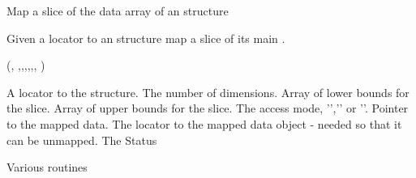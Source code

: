 \begin{manroutinedescription}
     Map a slice of the data array of an {} structure

     Given a locator to an {} structure map a slice of its main {%
}.

     {}

     {} {} ({},{%
},{},{},{},{},{},{%
})

\begin{manparametertable}
 A locator %
to the {}
                       structure.
 The number of %
dimensions.
 Array of %
lower bounds
                       for the slice.
 Array of %
upper bounds
                       for the slice.
 The access %
mode,
                       '{}','{}' or '{}'.
 Pointer to the %
mapped data.
 The %
locator to the
                       mapped data object - needed so that it can
                       be unmapped.
 The Status

\end{manparametertable}
     Various {} routines
\end{manroutinedescription}
